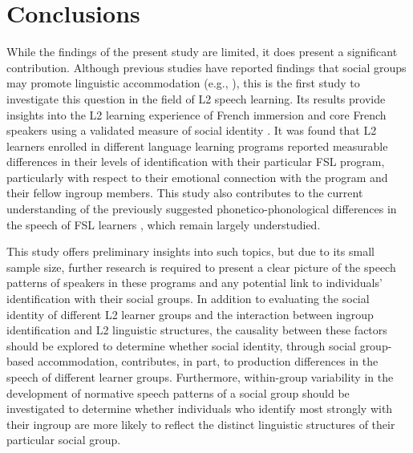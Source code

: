 \documentclass[output=paper,colorlinks,citecolor=brown,draftmode]{langscibook}
\begin{document}
\section{Conclusions}\label{sec:11:6}
While the findings of the present study are limited, it does present a significant contribution. Although previous studies have reported findings that social groups may promote linguistic accommodation (e.g., \citealt{Eckert1989, Eckert2008, Hall-LewFriskney2017, Lawson2011, McCafferty:1999, NardyBarbu2014}), this is the first study to investigate this question in the field of L2 speech learning. Its results provide insights into the L2 learning experience of French immersion and core French speakers using a validated measure of social identity \citep{LeachSpears2008}. It was found that L2 learners enrolled in different language learning programs reported measurable differences in their levels of identification with their particular FSL program, particularly with respect to their emotional connection with the program and their fellow ingroup members. This study also contributes to the current understanding of the previously suggested phonetico-phonological differences in the speech of FSL learners \citep{Poljak:2015}, which remain largely understudied.


This study offers preliminary insights into such topics, but due to its small sample size, further research is required to present a clear picture of the speech patterns of speakers in these programs and any potential link to individuals’ identification with their social groups. In addition to evaluating the social identity of different L2 learner groups and the interaction between ingroup identification and L2 linguistic structures, the causality between these factors should be explored to determine whether social identity, through social group-based accommodation, contributes, in part, to production differences in the speech of different learner groups. Furthermore, within-group variability in the development of normative speech patterns of a social group should be investigated to determine whether individuals who identify most strongly with their ingroup are more likely to reflect the distinct linguistic structures of their particular social group.


\newpage
{}\label{app:11:a}
\end{document}

